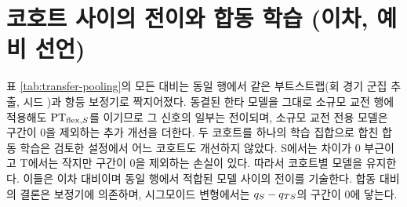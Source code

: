 \section{코호트 사이의 전이와 합동 학습 (이차, 예비 선언)}
\label{sec:pred-transfer}

표 \ref{tab:transfer-pooling}의 모든 대비는 동일 행에서 같은 부트스트랩(\numBootDraws{}회 경기 군집 추출, 시드 \bootSeed)과 항등 보정기로 짝지어졌다. 동결된 한타 모델을 그대로 소규모 교전 행에 적용해도 $\mathrm{PT}_{\mathrm{flex},S}$를 이기므로 그 신호의 일부는 전이되며, 소규모 교전 전용 모델은 구간이 0을 제외하는 추가 개선을 더한다. 두 코호트를 하나의 학습 집합으로 합친 합동 학습은 검토한 설정에서 어느 코호트도 개선하지 않았다. S에서는 차이가 0 부근이고 T에서는 작지만 구간이 0을 제외하는 손실이 있다. 따라서 코호트별 모델을 유지한다. 이들은 이차 대비이며 동일 행에서 적합된 모델 사이의 전이를 기술한다. 합동 대비의 결론은 보정기에 의존하며, 시그모이드 변형에서는 $q_{S} - q_{TS}$의 구간이 0에 닿는다.


